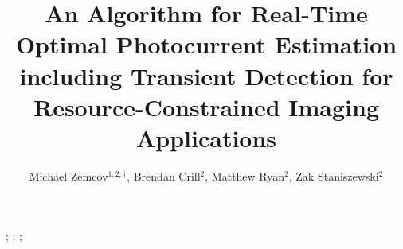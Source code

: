 \documentclass{ws-jai}
\begin{document}
\catchline{}{}{}{}{} %


\title{An Algorithm for Real-Time Optimal Photocurrent
  Estimation including Transient Detection for
  Resource-Constrained Imaging Applications}

\author{Michael Zemcov$^{1,2,\dagger}$, Brendan Crill$^2$, Matthew
  Ryan$^2$, Zak Staniszewski$^2$}

\address{
$^1$Center for Detectors, School of Physics and Astronomy, Rochester
Institute of Technology, Rochester, NY 14623, USA, zemcov@cfd.rit.edu\\
$^2$Jet Propulsion Laboratory, Pasadena, CA 91109, USA \\
}

\maketitle


\begin{history}
;
;
;
\end{history}
\end{document}
